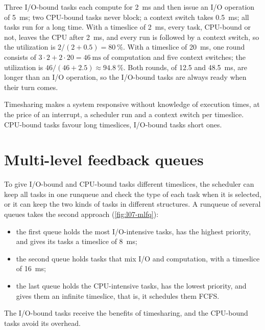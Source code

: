\documentclass[../main.tex]{subfiles}
\begin{document}
\begin{example}
  Three I/O-bound tasks each compute for \SI{2}{\milli\second} and then
  issue an I/O operation of \SI{5}{\milli\second}; two CPU-bound tasks
  never block; a context switch takes \SI{0.5}{\milli\second}; all tasks run
  for a long time.  With a timeslice of \SI{2}{\milli\second}, every task,
  CPU-bound or not, leaves the CPU after \SI{2}{\milli\second}, and every
  run is followed by a context switch, so the utilization is
  $2/(2+0.5) = \SI{80}{\percent}$.  With a timeslice of
  \SI{20}{\milli\second}, one round consists of $3\cdot 2 + 2\cdot 20 =
  \SI{46}{\milli\second}$ of computation and five context switches; the
  utilization is $46/(46+2.5) \approx \SI{94.8}{\percent}$.  Both rounds,
  of 12.5 and \SI{48.5}{\milli\second}, are longer than an I/O operation,
  so the I/O-bound tasks are always ready when their turn
  comes.
\end{example}

\begin{keypoint}
  Timesharing makes a system responsive without knowledge of execution
  times, at the price of an interrupt, a scheduler run and a context
  switch per timeslice.  CPU-bound tasks favour long timeslices, I/O-bound
  tasks short ones.
\end{keypoint}

\section{Multi-level feedback queues}
\label{sec:l07-mlfq}

To give I/O-bound and CPU-bound tasks different timeslices, the scheduler
can keep all tasks in one runqueue and check the type of each task when it
is selected, or it can keep the two kinds of tasks in different
structures.  A runqueue of several queues takes the second
approach (\cref{fig:l07-mlfq}):
\begin{itemize}
  \item the first queue holds the most I/O-intensive tasks, has the highest
    priority, and gives its tasks a timeslice of \SI{8}{\milli\second};
  \item the second queue holds tasks that mix I/O and computation, with a
    timeslice of \SI{16}{\milli\second};
  \item the last queue holds the CPU-intensive tasks, has the lowest
    priority, and gives them an infinite timeslice, that is, it schedules
    them FCFS.
\end{itemize}
The I/O-bound tasks receive the benefits of timesharing, and the CPU-bound
tasks avoid its overhead.
\end{document}
